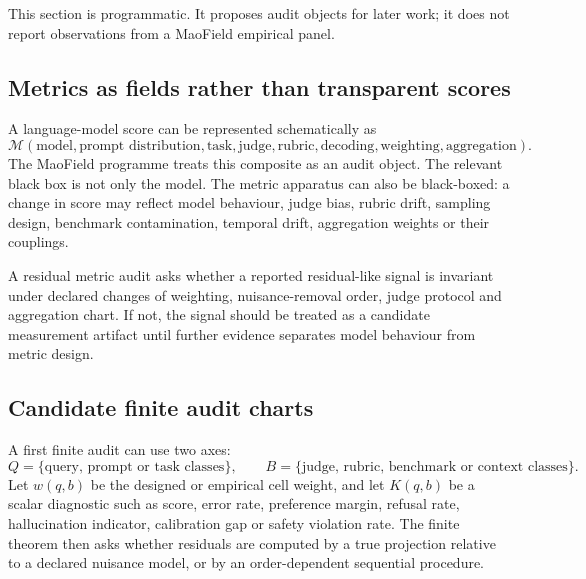 \documentclass[11pt]{article}
\theoremstyle{remark}
\begin{document}
This section is programmatic. It proposes audit objects for later work; it does not report observations from a MaoField empirical panel.

\subsection{Metrics as fields rather than transparent scores}

A language-model score can be represented schematically as
\[
\mathcal{M}(\text{model},\text{prompt distribution},\text{task},\text{judge},\text{rubric},\text{decoding},\text{weighting},\text{aggregation}).
\]
The MaoField programme treats this composite as an audit object. The relevant black box is not only the model. The metric apparatus can also be black-boxed: a change in score may reflect model behaviour, judge bias, rubric drift, sampling design, benchmark contamination, temporal drift, aggregation weights or their couplings.

A residual metric audit asks whether a reported residual-like signal is invariant under declared changes of weighting, nuisance-removal order, judge protocol and aggregation chart. If not, the signal should be treated as a candidate measurement artifact until further evidence separates model behaviour from metric design.

\subsection{Candidate finite audit charts}

A first finite audit can use two axes:
\[
Q=\{\text{query, prompt or task classes}\},\qquad
B=\{\text{judge, rubric, benchmark or context classes}\}.
\]
Let $w(q,b)$ be the designed or empirical cell weight, and let $K(q,b)$ be a scalar diagnostic such as score, error rate, preference margin, refusal rate, hallucination indicator, calibration gap or safety violation rate. The finite theorem then asks whether residuals are computed by a true projection relative to a declared nuisance model, or by an order-dependent sequential procedure.
\end{document}
